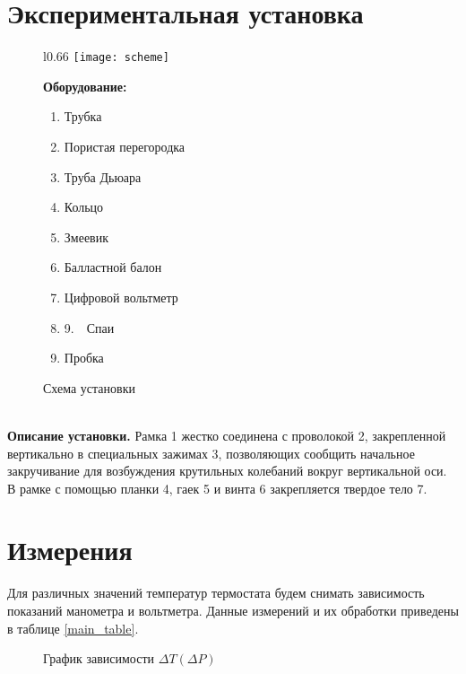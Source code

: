 \documentclass[a4paper,12pt]{article} %
\begin{document}
\section{Экспериментальная установка}
\begin{figure}[!h]
	\begin{wrapfigure}[50]{l}{0.66\textwidth}\centering
		\texttt{[image: scheme]}
		\caption{Схема установки} 
	\end{wrapfigure}
	
	\textbf{Оборудование:}
	\begin{enumerate}
		\item Трубка
		\item Пористая перегородка
		\item Труба Дьюара
		\item Кольцо
		\item Змеевик
		\item Балластной балон
		\item Цифровой вольтметр
		\item 9.~~Спаи
		\setcounter{enumi}{9}
		\item Пробка
	\end{enumerate}
\end{figure}
\textbf{\\[1ex]Описание установки. }Рамка 1 жестко соединена с
проволокой 2, закрепленной вертикально в специальных зажимах 3,
позволяющих сообщить начальное закручивание для возбуждения крутильных
колебаний вокруг вертикальной оси. В рамке с помощью планки 4,
гаек 5 и винта 6 закрепляется твердое тело 7.

\section{Измерения}	 
\begin{table}[h]\centering\small
	
	\caption{Зависимость напряжения от перепада давлений}
	\label{main_table}
\end{table}
\noindent Для различных значений температур термостата будем снимать зависимость
показаний манометра и вольтметра. Данные измерений и их обработки 
приведены в таблице \ref{main_table}.

\begin{figure}[h!]\centering
	
	\caption{График зависимости $ \Delta T(\Delta P) $}
\end{figure}
\end{document}
